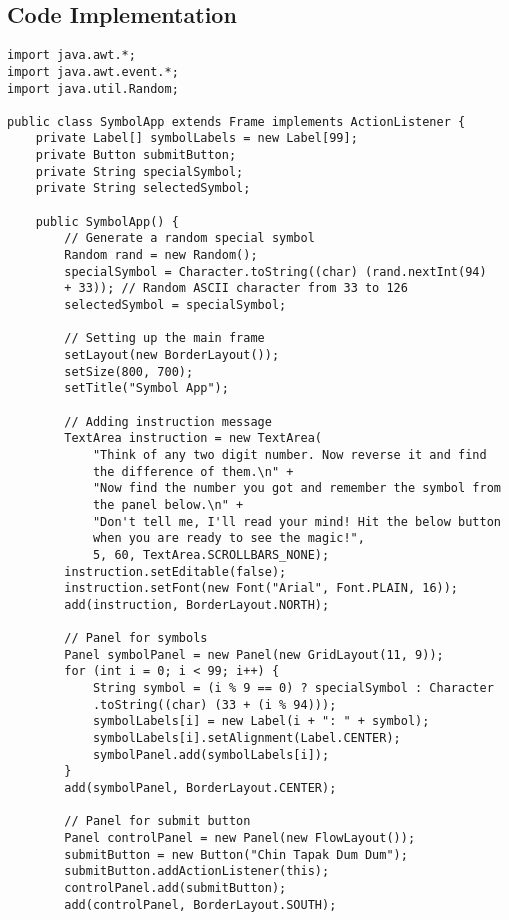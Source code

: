 \subsection{Code Implementation}
\begin{mdframed}
\begin{verbatim}
import java.awt.*;
import java.awt.event.*;
import java.util.Random;

public class SymbolApp extends Frame implements ActionListener {
    private Label[] symbolLabels = new Label[99];
    private Button submitButton;
    private String specialSymbol;
    private String selectedSymbol;

    public SymbolApp() {
        // Generate a random special symbol
        Random rand = new Random();
        specialSymbol = Character.toString((char) (rand.nextInt(94) 
        + 33)); // Random ASCII character from 33 to 126
        selectedSymbol = specialSymbol;

        // Setting up the main frame
        setLayout(new BorderLayout());
        setSize(800, 700);
        setTitle("Symbol App");

        // Adding instruction message
        TextArea instruction = new TextArea(
            "Think of any two digit number. Now reverse it and find 
            the difference of them.\n" +
            "Now find the number you got and remember the symbol from 
            the panel below.\n" +
            "Don't tell me, I'll read your mind! Hit the below button 
            when you are ready to see the magic!",
            5, 60, TextArea.SCROLLBARS_NONE);
        instruction.setEditable(false);
        instruction.setFont(new Font("Arial", Font.PLAIN, 16));
        add(instruction, BorderLayout.NORTH);

        // Panel for symbols
        Panel symbolPanel = new Panel(new GridLayout(11, 9));
        for (int i = 0; i < 99; i++) {
            String symbol = (i % 9 == 0) ? specialSymbol : Character
            .toString((char) (33 + (i % 94)));
            symbolLabels[i] = new Label(i + ": " + symbol); 
            symbolLabels[i].setAlignment(Label.CENTER);
            symbolPanel.add(symbolLabels[i]);
        }
        add(symbolPanel, BorderLayout.CENTER);

        // Panel for submit button
        Panel controlPanel = new Panel(new FlowLayout());
        submitButton = new Button("Chin Tapak Dum Dum");
        submitButton.addActionListener(this);
        controlPanel.add(submitButton);
        add(controlPanel, BorderLayout.SOUTH);


\end{verbatim}
\end{mdframed}
